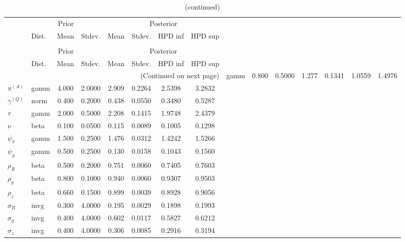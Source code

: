  
\begin{center}
\begin{longtable}{llcccccc} 
\caption{Results from Metropolis-Hastings (parameters)}
 \label{Table:MHPosterior:1}\\
\toprule 
  & \multicolumn{3}{c}{Prior}  &  \multicolumn{4}{c}{Posterior} \\
  \cmidrule(r{.75em}){2-4} \cmidrule(r{.75em}){5-8}
  & Dist. & Mean  & Stdev. & Mean & Stdev. & HPD inf & HPD sup\\
\midrule \endfirsthead 
\caption{(continued)}\\\toprule 
  & \multicolumn{3}{c}{Prior}  &  \multicolumn{4}{c}{Posterior} \\
  \cmidrule(r{.75em}){2-4} \cmidrule(r{.75em}){5-8}
  & Dist. & Mean  & Stdev. & Mean & Stdev. & HPD inf & HPD sup\\
\midrule \endhead 
\bottomrule \multicolumn{8}{r}{(Continued on next page)} \endfoot 
\bottomrule \endlastfoot 
${r_{A}}$ & gamm &   0.800 & 0.5000 &   1.277& 0.1341 &  1.0559 &  1.4976 \\ 
${\pi^{(A)}}$ & gamm &   4.000 & 2.0000 &   2.909& 0.2264 &  2.5398 &  3.2832 \\ 
${\gamma^{(Q)}}$ & norm &   0.400 & 0.2000 &   0.438& 0.0550 &  0.3480 &  0.5287 \\ 
${\tau}$ & gamm &   2.000 & 0.5000 &   2.208& 0.1415 &  1.9748 &  2.4379 \\ 
${\nu}$ & beta &   0.100 & 0.0500 &   0.115& 0.0089 &  0.1005 &  0.1298 \\ 
${\psi_\pi}$ & gamm &   1.500 & 0.2500 &   1.476& 0.0312 &  1.4242 &  1.5266 \\ 
${\psi_y}$ & gamm &   0.500 & 0.2500 &   0.130& 0.0158 &  0.1043 &  0.1560 \\ 
${\rho_R}$ & beta &   0.500 & 0.2000 &   0.751& 0.0060 &  0.7405 &  0.7603 \\ 
${\rho_{g}}$ & beta &   0.800 & 0.1000 &   0.940& 0.0060 &  0.9307 &  0.9503 \\ 
${\rho_z}$ & beta &   0.660 & 0.1500 &   0.899& 0.0039 &  0.8928 &  0.9056 \\ 
${\sigma_R}$ & invg &   0.300 & 4.0000 &   0.195& 0.0029 &  0.1898 &  0.1993 \\ 
${\sigma_{g}}$ & invg &   0.400 & 4.0000 &   0.602& 0.0117 &  0.5827 &  0.6212 \\ 
${\sigma_z}$ & invg &   0.400 & 4.0000 &   0.306& 0.0085 &  0.2916 &  0.3194 \\ 
\end{longtable}
 \end{center}
